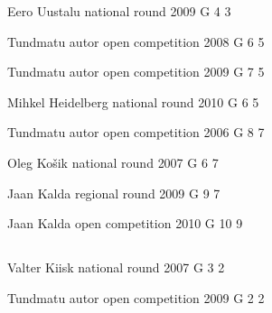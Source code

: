 \documentclass[11pt]{article}
\begin{document}
\ylDisplay{} %
{Eero Uustalu} %
{national round} %
{2009} %
{G 4} %
{3} %
{

\ifEngStatement
\fi
}

\ylDisplay{} %
{Tundmatu autor} %
{open competition} %
{2008} %
{G 6} %
{5} %
{

\ifEngStatement
\fi
}

\ylDisplay{} %
{Tundmatu autor} %
{open competition} %
{2009} %
{G 7} %
{5} %
{

\ifEngStatement
\fi
}

\ylDisplay{} %
{Mihkel Heidelberg} %
{national round} %
{2010} %
{G 6} %
{5} %
{

\ifEngStatement
\fi
}

\ylDisplay{} %
{Tundmatu autor} %
{open competition} %
{2006} %
{G 8} %
{7} %
{

\ifEngStatement
\fi
}

\ylDisplay{} %
{Oleg Košik} %
{national round} %
{2007} %
{G 6} %
{7} %
{

\ifEngStatement
\fi
}

\ylDisplay{} %
{Jaan Kalda} %
{regional round} %
{2009} %
{G 9} %
{7} %
{

\ifEngStatement
\fi
}

\ylDisplay{} %
{Jaan Kalda} %
{open competition} %
{2010} %
{G 10} %
{9} %
{

\ifEngStatement
\fi
}
\newpage\subsection{\protect{}}

\ylDisplay{} %
{Valter Kiisk} %
{national round} %
{2007} %
{G 3} %
{2} %
{

\ifEngStatement
\fi
}

\ylDisplay{} %
{Tundmatu autor} %
{open competition} %
{2009} %
{G 2} %
{2} %
{

\ifEngStatement
\fi
}
\end{document}
